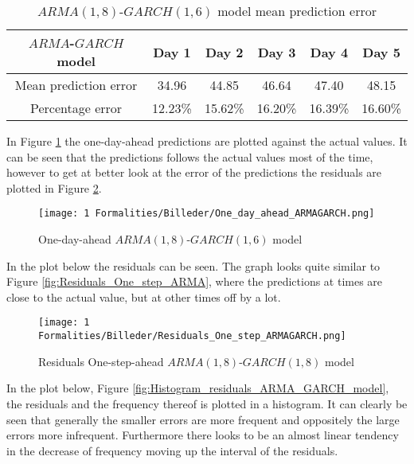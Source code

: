 \begin{table}[H]
  \centering
  \begin{tabular}{|c|c|c|c|c|c|}
    \hline
    $ARMA$-$GARCH$ model & Day 1 & Day 2 & Day 3 & Day 4 & Day 5 \\
    \hline
    Mean prediction error & 34.96 & 44.85 & 46.64 & 47.40 & 48.15  \\
    \hline
    Percentage error & 12.23\% & 15.62\% & 16.20\% & 16.39\% & 16.60\%   \\
    \hline    
  \end{tabular}
  \caption{$ARMA(1,8)$-$GARCH(1,6)$ model mean prediction error}
  \label{tab:ARMA_GARCH_mean_prediction_error}
\end{table}
\noindent 
\noindent In Figure \ref{fig:One_day_ahead_ARMAGARCH} the one-day-ahead predictions are plotted against the actual values. It can be seen that the predictions follows the actual values most of the time, however to get at better look at the error of the predictions the residuals are plotted in Figure \ref{fig:Residuals_One_step_ARMAGARCH}.
\begin{figure}[H]
    \centering
    \texttt{[image: 1 Formalities/Billeder/One\_day\_ahead\_ARMAGARCH.png]}
    \caption{One-day-ahead $ARMA(1,8)$-$GARCH(1,6)$ model}
    \label{fig:One_day_ahead_ARMAGARCH}
\end{figure}
\noindent In the plot below the residuals can be seen. The graph looks quite similar to Figure \ref{fig:Residuals_One_step_ARMA}, where the predictions at times are close to the actual value, but at other times off by a lot.

\begin{figure}[H]
    \centering
    \texttt{[image: 1 Formalities/Billeder/Residuals\_One\_step\_ARMAGARCH.png]}
    \caption{Residuals One-step-ahead $ARMA(1,8)$-$GARCH(1,8)$ model}
    \label{fig:Residuals_One_step_ARMAGARCH}
\end{figure}
\noindent In the plot below, Figure \ref{fig:Histogram_residuals_ARMA_GARCH_model}, the residuals and the frequency thereof is plotted in a histogram. It can clearly be seen that generally the smaller errors are more frequent and oppositely the large errors more infrequent. Furthermore there looks to be an almost linear tendency in the decrease of frequency moving up the interval of the residuals.

\begin{comment}
            mu           ar1           ma1           ma2           ma3           ma4 
 9.482875e-04  5.799823e-01 -9.536230e-01  6.682205e-03  8.892152e-03 -4.077005e-03 
          ma5           ma6           ma7           ma8         omega        alpha1 
 2.952357e-03 -5.486665e-03 -9.265872e-01  8.785459e-01  6.315973e+01  1.797387e-01 
        beta1         beta2         beta3         beta4         beta5         beta6 
 2.178421e-01  1.480322e-06  4.143257e-07  2.882261e-01  2.885443e-01  1.781170e-06 

\end{comment}

